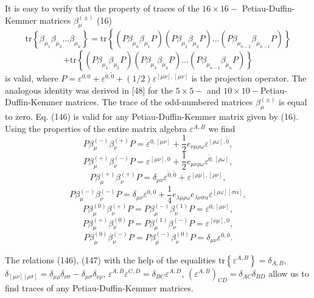 \documentclass[a4paper,12pt]{article}
\begin{document}
It is easy to verify that the property of traces of the $16\times 16-$
Petiau-Duffin-Kemmer matrices $\beta _\mu ^{(\pm )}$ (16)
\[
\mbox{tr}\left\{ \beta _{\mu _1}\beta _{\mu _2}...\beta _{\mu
_n}\right\} = \mbox{tr}\left\{ \left( P\beta _{\mu _n}\beta _{\mu
_1}P\right) \left( P\beta _{\mu _2}\beta _{\mu _3}P\right)
...\left( P\beta _{\mu _{n-2}}\beta _{\mu _{n-1}}P\right) \right\}
\]
\vspace{-8mm}
\begin{equation}  \label{146}
\end{equation}
\vspace{-8mm}
\[
+\mbox{tr}\left\{ \left( P\beta _{\mu _1}\beta _{\mu _2}P\right)
\left( P\beta _{\mu _3}\beta _{\mu _4}P\right) ...\left( P\beta
_{\mu _{n-1}}\beta _{\mu _n}P\right) \right\}
\]
is valid, where $P=\varepsilon ^{0,0}+\varepsilon
^{\widetilde{0},\widetilde{ 0}}+(1/2)\varepsilon ^{[\mu \nu ],[\mu
\nu ]}$ is the projection operator. The analogous identity was
derived in [48] for the $5\times 5-$ and $ 10\times
10-$Petiau-Duffin-Kemmer matrices. The trace of the odd-numbered
matrices $\beta _\mu ^{(\pm )}$ is equal to zero. Eq. (146) is
valid for any Petiau-Duffin-Kemmer matrix given by (16). Using the
properties of the entire matrix algebra $\varepsilon ^{A,B}$ we
find
\[
P\beta _\mu ^{(-)}\beta _\nu ^{(+)}P=\varepsilon ^{0,[\mu \nu
]}+\frac 12e_{\nu \mu \rho \omega }\varepsilon ^{[\rho \omega
],\widetilde{0}} ,
\]
\[
P\beta _\mu ^{(+)}\beta _\nu ^{(-)}P=\varepsilon ^{[\mu \nu
],0}+\frac 12e_{\mu \nu \rho \omega }\varepsilon
^{\widetilde{0},[\rho \omega ]} ,
\]
\[
P\beta _\mu ^{(+)}\beta _\nu ^{(+)}P=\delta _{\mu \nu }\varepsilon
^{ \widetilde{0},\widetilde{0}}+\varepsilon ^{[\rho \mu ],[\rho
\nu ]} ,
\]
\begin{equation}
P\beta _\mu ^{(-)}\beta _\nu ^{(-)}P=\delta _{\mu \nu }\varepsilon
^{0,0}+\frac 14e_{\lambda \mu \rho \omega }e_{\lambda \nu \sigma
\alpha }\varepsilon ^{[\rho \omega ][\sigma \alpha ]} ,\label{147}
\end{equation}
\[
P\beta _\mu ^{(0)}\beta _\nu ^{(+)}P=P\beta _\mu ^{(-)}\beta _\nu
^{(1)}P=\varepsilon ^{0,[\mu \nu ]} ,
\]
\[
P\beta _\mu ^{(+)}\beta _\nu ^{(0)}P=P\beta _\mu ^{(1)}\beta _\nu
^{(-)}P=\varepsilon ^{[\nu \mu ],0} ,
\]
\[
P\beta _\mu ^{(0)}\beta _\nu ^{(-)}P=P\beta _\mu ^{(-)}\beta _\nu
^{(0)}P=\delta _{\mu \nu }\varepsilon ^{0,0} .
\]

The relations (146), (147) with the help of the equalities
tr$\left\{ \varepsilon ^{A,B}\right\} =\delta _{A,B}$, $\delta
_{[\mu \nu ][\rho \sigma ]}=\delta _{\mu \rho }\delta _{\nu \sigma
}-\delta _{\mu \sigma }\delta _{\nu \rho }$, $\varepsilon
^{A,B}\varepsilon ^{C,D}=\delta _{BC}\varepsilon ^{A,D}$, $\left(
\varepsilon ^{A,B}\right) _{CD}=\delta _{AC}\delta _{BD}$ allow us
to find traces of any Petiau-Duffin-Kemmer matrices.
\end{document}
